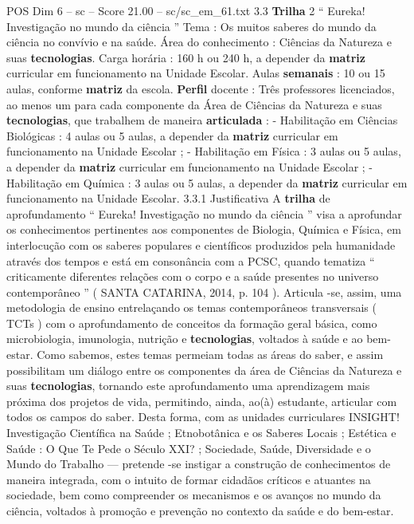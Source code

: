 \begin{textsample}{POS Dim 6 – sc – Score 21.00 – sc/sc\_em\_61.txt}  \label{ex:f6_pos_017}
3.3 \textbf{Trilha} 2 “ Eureka!
Investigação no mundo da ciência ” Tema : Os muitos saberes do mundo da ciência no convívio e na saúde.
Área do conhecimento : Ciências da Natureza e suas \textbf{tecnologias}.
Carga horária : 160 h ou 240 h, a depender da \textbf{matriz} curricular em funcionamento na Unidade Escolar.
Aulas \textbf{semanais} : 10 ou 15 aulas, conforme \textbf{matriz} da escola. \textbf{Perfil} docente : Três professores licenciados, ao menos um para cada componente da Área de Ciências da Natureza e suas \textbf{tecnologias}, que trabalhem de maneira \textbf{articulada} : - Habilitação em Ciências Biológicas : 4 aulas ou 5 aulas, a depender da \textbf{matriz} curricular em funcionamento na Unidade Escolar ; - Habilitação em Física : 3 aulas ou 5 aulas, a depender da \textbf{matriz} curricular em funcionamento na Unidade Escolar ; - Habilitação em Química : 3 aulas ou 5 aulas, a depender da \textbf{matriz} curricular em funcionamento na Unidade Escolar. 3.3.1 Justificativa A \textbf{trilha} de aprofundamento “ Eureka!
Investigação no mundo da ciência ” visa a aprofundar os conhecimentos pertinentes aos componentes de Biologia, Química e Física, em interlocução com os saberes populares e científicos produzidos pela humanidade através dos tempos e está em consonância com a PCSC, quando tematiza “ criticamente diferentes relações com o corpo e a saúde presentes no universo contemporâneo ” ( SANTA CATARINA, 2014, p. 104 ).
Articula -se, assim, uma metodologia de ensino entrelaçando os temas contemporâneos transversais ( TCTs ) com o aprofundamento de conceitos da formação geral básica, como microbiologia, imunologia, nutrição e \textbf{tecnologias}, voltados à saúde e ao bem-estar.
Como sabemos, estes temas permeiam todas as áreas do saber, e assim possibilitam um diálogo entre os componentes da área de Ciências da Natureza e suas \textbf{tecnologias}, tornando este aprofundamento uma aprendizagem mais próxima dos projetos de vida, permitindo, ainda, ao(à) estudante, articular com todos os campos do saber.
Desta forma, com as unidades curriculares INSIGHT!
Investigação Científica na Saúde ; Etnobotânica e os Saberes Locais ; Estética e Saúde : O Que Te Pede o Século XXI? ; Sociedade, Saúde, Diversidade e o Mundo do Trabalho — pretende -se instigar a construção de conhecimentos de maneira integrada, com o intuito de formar cidadãos críticos e atuantes na sociedade, bem como compreender os mecanismos e os avanços no mundo da ciência, voltados à promoção e prevenção no contexto da saúde e do bem-estar.

\end{textsample}

